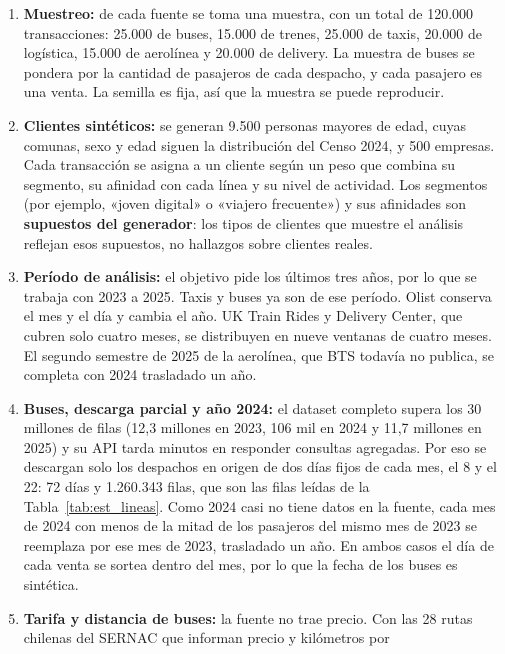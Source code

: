 \begin{enumerate}[leftmargin=*]
  \item \textbf{Muestreo:} de cada fuente se toma una muestra, con un total de
        120.000 transacciones: 25.000 de buses, 15.000 de trenes, 25.000 de
        taxis, 20.000 de logística, 15.000 de aerolínea y 20.000 de delivery.
        La muestra de buses se pondera por la cantidad de pasajeros de cada
        despacho, y cada pasajero es una venta. La semilla es fija, así que la
        muestra se puede reproducir.
  \item \textbf{Clientes sintéticos:} se generan 9.500 personas mayores de
        edad, cuyas comunas, sexo y edad siguen la distribución del Censo 2024,
        y 500 empresas. Cada transacción se asigna a un cliente según un peso
        que combina su segmento, su afinidad con cada línea y su nivel de
        actividad. Los segmentos (por ejemplo, «joven digital» o «viajero
        frecuente») y sus afinidades son \textbf{supuestos del generador}: los
        tipos de clientes que muestre el análisis reflejan esos supuestos, no
        hallazgos sobre clientes reales.
  \item \textbf{Período de análisis:} el objetivo pide los últimos tres años,
        por lo que se trabaja con 2023 a 2025. Taxis y buses ya son de ese
        período. Olist conserva el mes y el día y cambia el año. UK Train Rides
        y Delivery Center, que cubren solo cuatro meses, se distribuyen en
        nueve ventanas de cuatro meses. El segundo semestre de 2025 de la
        aerolínea, que BTS todavía no publica, se completa con 2024 trasladado
        un año.
  \item \textbf{Buses, descarga parcial y año 2024:} el dataset completo
        supera los 30 millones de filas (12,3 millones en 2023, 106 mil en 2024
        y 11,7 millones en 2025) y su API tarda minutos en responder consultas
        agregadas. Por eso se descargan solo los despachos en origen de dos
        días fijos de cada mes, el 8 y el 22: 72 días y 1.260.343 filas, que
        son las filas leídas de la Tabla~\ref{tab:est_lineas}. Como 2024 casi
        no tiene datos en la fuente, cada mes de 2024 con menos de la mitad de
        los pasajeros del mismo mes de 2023 se reemplaza por ese mes de 2023,
        trasladado un año. En ambos casos el día de cada venta se sortea dentro
        del mes, por lo que la fecha de los buses es sintética.
  \item \textbf{Tarifa y distancia de buses:} la fuente no trae precio. Con las
        28 rutas chilenas del SERNAC que informan precio y kilómetros por

\end{enumerate}
